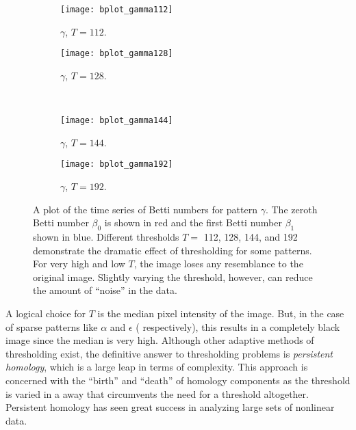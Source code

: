 \begin{sidewaysfigure}[hp]
	\centering
	\begin{subfigure}[b]{0.45\textwidth}
                \texttt{[image: bplot\_gamma112]}
                \caption{$\gamma$, $T = 112$.}
                \label{fig:bplot_gamma112}
        \end{subfigure} \quad
	\begin{subfigure}[b]{0.45\textwidth}
                \texttt{[image: bplot\_gamma128]}
                \caption{$\gamma$, $T = 128$.}
                \label{fig:bplot_gamma128}
        \end{subfigure} \hfill \\
	\begin{subfigure}[b]{0.45\textwidth}
                \texttt{[image: bplot\_gamma144]}
                \caption{$\gamma$, $T = 144$.}
                \label{fig:bplot_gamma144}
       \end{subfigure} \quad
       \begin{subfigure}[b]{0.45\textwidth}
                \texttt{[image: bplot\_gamma192]}
                \caption{$\gamma$, $T = 192$.}
                \label{fig:bplot_gamma192}
        \end{subfigure}
        
        \caption{A plot of the time series of Betti numbers for pattern $\gamma$. The zeroth Betti number $\beta_0$ is shown in red and the first Betti number $\beta_1$ shown in blue. Different thresholds $T =$ 112, 128, 144, and 192 demonstrate the dramatic effect of thresholding for some patterns. For very high and low $T$, the image loses any resemblance to the original image. Slightly varying the threshold, however, can reduce the amount of ``noise'' in the data.} \label{fig:bplots_gamma}
\end{sidewaysfigure}

A logical choice for $T$ is the median pixel intensity of the image. But, in the case of sparse patterns like $\alpha$ and $\epsilon$ ( respectively), this results in a completely black image since the median is very high. Although other adaptive methods of thresholding exist, the definitive answer to thresholding problems is \emph{persistent homology}, which is a large leap in terms of complexity. This approach is concerned with the ``birth'' and ``death'' of homology components as the threshold is varied in a away that circumvents the need for a threshold altogether. Persistent homology has seen great success in analyzing large sets of nonlinear data.

